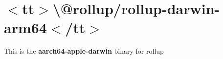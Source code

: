 \chapter{\texorpdfstring{$<$}{<}tt\texorpdfstring{$>$}{>}\textbackslash{}@rollup/rollup-\/darwin-\/arm64\texorpdfstring{$<$}{<}/tt\texorpdfstring{$>$}{>}}
\hypertarget{md__2_users_2hello_2_documents_2_git_hub_2finalproject-engine-drop-table-engines_2_engine_2src_29d968721a7ffa402a1d446f393ea252b}{}\label{md__2_users_2hello_2_documents_2_git_hub_2finalproject-engine-drop-table-engines_2_engine_2src_29d968721a7ffa402a1d446f393ea252b}
\label{md__2_users_2hello_2_documents_2_git_hub_2finalproject-engine-drop-table-engines_2_engine_2src_29d968721a7ffa402a1d446f393ea252b_autotoc_md1340}%
%


This is the {\bfseries{aarch64-\/apple-\/darwin}} binary for {\ttfamily rollup} 